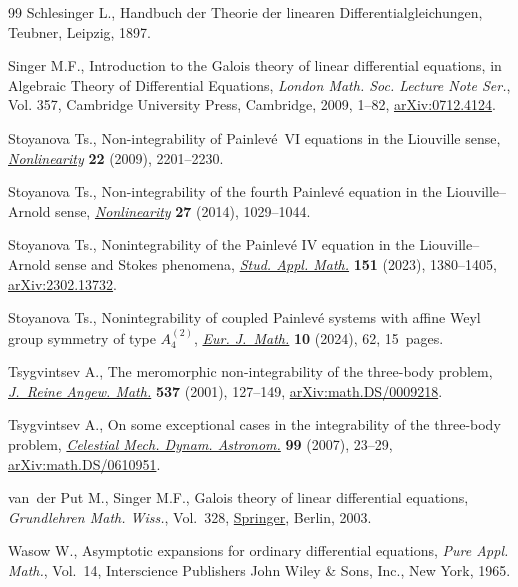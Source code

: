 \begin{thebibliography}{99}
Schlesinger L., Handbuch der {T}heorie der linearen {D}ifferentialgleichungen,
 Teubner, Leipzig, 1897.

Singer M.F., Introduction to the {G}alois theory of linear differential
 equations, in Algebraic Theory of Differential Equations, \textit{London
 Math. Soc. Lecture Note Ser.}, Vol. 357, Cambridge University Press,
 Cambridge, 2009, 1--82, \href{https://arxiv.org/abs/0712.4124}{arXiv:0712.4124}.

Stoyanova Ts., Non-integrability of {P}ainlev\'e~{VI} equations in the
 {L}iouville sense, \href{https://doi.org/10.1088/0951-7715/22/9/008}{\textit{Nonlinearity}} \textbf{22} (2009), 2201--2230.

Stoyanova Ts., Non-integrability of the fourth {P}ainlev\'e equation in the
 {L}iouville--{A}rnold sense, \href{https://doi.org/10.1088/0951-7715/27/5/1029}{\textit{Nonlinearity}} \textbf{27} (2014),
 1029--1044.

Stoyanova Ts., Nonintegrability of the {P}ainlev\'e {IV} equation in the
 {L}iouville--{A}rnold sense and {S}tokes phenomena, \href{https://doi.org/10.1111/sapm.12629}{\textit{Stud. Appl.
 Math.}} \textbf{151} (2023), 1380--1405, \href{https://arxiv.org/abs/2302.13732}{arXiv:2302.13732}.

Stoyanova Ts., Nonintegrability of coupled {P}ainlev\'e systems with affine
 {W}eyl group symmetry of type {$A_4^{(2)}$}, \href{https://doi.org/10.1007/s40879-024-00781-x}{\textit{Eur. J.~Math.}}
 \textbf{10} (2024), 62, 15~pages.

Tsygvintsev A., The meromorphic non-integrability of the three-body problem,
 \href{https://doi.org/10.1515/crll.2001.061}{\textit{J.~Reine Angew. Math.}} \textbf{537} (2001), 127--149,
 \href{https://arxiv.org/abs/math.DS/0009218}{arXiv:math.DS/0009218}.

Tsygvintsev A., On some exceptional cases in the integrability of the
 three-body problem, \href{https://doi.org/10.1007/s10569-007-9086-5}{\textit{Celestial Mech. Dynam. Astronom.}} \textbf{99}
 (2007), 23--29, \href{https://arxiv.org/abs/math.DS/0610951}{arXiv:math.DS/0610951}.

van~der Put M., Singer M.F., Galois theory of linear differential equations,
 \textit{Grundlehren Math. Wiss.}, Vol.~328, \href{https://doi.org/10.1007/978-3-642-55750-7}{Springer}, Berlin, 2003.

Wasow W., Asymptotic expansions for ordinary differential equations,
 \textit{Pure Appl. Math.}, Vol.~14, Interscience Publishers John Wiley \&
 Sons, Inc., New York, 1965.

\end{thebibliography}\LastPageEnding
